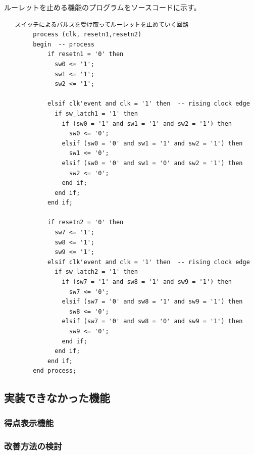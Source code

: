 \documentclass{ltjsarticle}
\begin{document}
		ルーレットを止める機能のプログラムをソースコードに示す。
		\begin{lstlisting}[caption = sample08::ルーレットを止める機能, label = code:rouletteStop]
		  -- スイッチによるパルスを受け取ってルーレットを止めていく回路
		process (clk, resetn1,resetn2)
		begin  -- process
			if resetn1 = '0' then
			  sw0 <= '1';
			  sw1 <= '1';
			  sw2 <= '1';

			elsif clk'event and clk = '1' then  -- rising clock edge
			  if sw_latch1 = '1' then
			    if (sw0 = '1' and sw1 = '1' and sw2 = '1') then
			      sw0 <= '0';
			    elsif (sw0 = '0' and sw1 = '1' and sw2 = '1') then
			      sw1 <= '0';
			    elsif (sw0 = '0' and sw1 = '0' and sw2 = '1') then
			      sw2 <= '0';
			    end if;
			  end if;
			end if;
				
			if resetn2 = '0' then
			  sw7 <= '1';
			  sw8 <= '1';
			  sw9 <= '1';
			elsif clk'event and clk = '1' then  -- rising clock edge
			  if sw_latch2 = '1' then
			    if (sw7 = '1' and sw8 = '1' and sw9 = '1') then
			      sw7 <= '0';
			    elsif (sw7 = '0' and sw8 = '1' and sw9 = '1') then
			      sw8 <= '0';
			    elsif (sw7 = '0' and sw8 = '0' and sw9 = '1') then
			      sw9 <= '0';
			    end if;
			  end if;
		    end if;
		end process;
		\end{lstlisting}
	\subsection{実装できなかった機能}
		\subsubsection{得点表示機能}
		\subsubsection{改善方法の検討}
\end{document}
